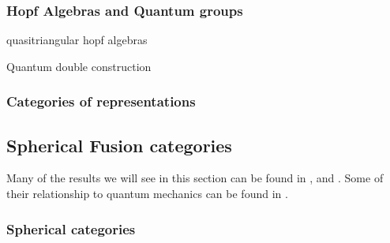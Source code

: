 \documentclass{article}
\newenvironment{definition}[1][Definition]{\begin{trivlist}
\item[\hskip \labelsep {\bfseries #1}]}{\end{trivlist}}
\begin{document}

\subsubsection{Hopf Algebras and Quantum groups}
quasitriangular hopf algebras \\
\begin{definition}
Quantum double construction
\end{definition}

\subsubsection{Categories of representations}


\subsection{Spherical Fusion categories}
Many of the results we will see in this section can be found in \cite{Mueger08}, \cite{Bartlett15} and \cite{Freyd66}. Some of their relationship to quantum mechanics can be found in \cite{Vicary12}.  
\subsubsection{Spherical categories}
\end{document}
